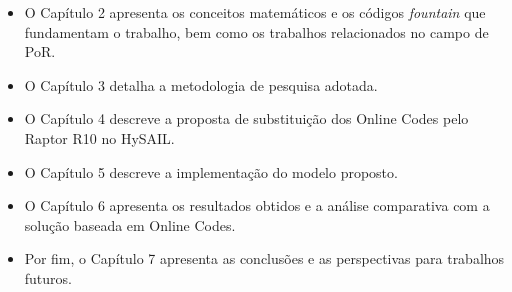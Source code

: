 \begin{itemize}
\item O Capítulo 2 apresenta os conceitos matemáticos e os códigos \emph{fountain} que fundamentam o trabalho, bem como os trabalhos relacionados no campo de \acrshort{PoR}.
\item O Capítulo 3 detalha a metodologia de pesquisa adotada.
\item O Capítulo 4 descreve a proposta de substituição dos Online Codes pelo Raptor R10 no HySAIL.
\item O Capítulo 5 descreve a implementação do modelo proposto.
\item O Capítulo 6 apresenta os resultados obtidos e a análise comparativa com a solução baseada em Online Codes.
\item Por fim, o Capítulo 7 apresenta as conclusões e as perspectivas para trabalhos futuros.
\end{itemize}
